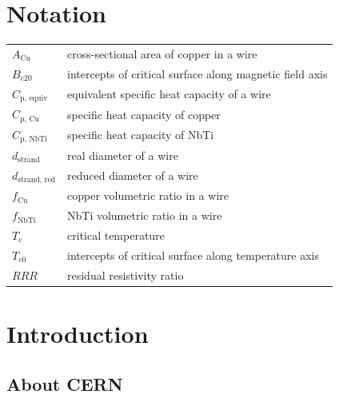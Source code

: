 \documentclass{article}
\begin{document}

\clearpage\thispagestyle{empty}
\tableofcontents
\clearpage\thispagestyle{empty}

\section*{Notation}

\begin{table}[h!]
    \vspace{-1.em} 
    \fontsize{10}{10}
    \selectfont 
    \renewcommand{\arraystretch}{1.5}
    \begin{center}
    \begin{tabular}{ l l }  
    \hline
    $A_\text{Cu}$ & cross-sectional area of copper in a wire \\  
    $B_\text{c20}$ & intercepts of critical surface along magnetic field axis \\  
    $C_\text{p, equiv}$ & equivalent specific heat capacity of a wire \\  
    $C_\text{p, Cu}$ & specific heat capacity of copper \\   
    $C_\text{p, NbTi}$ & specific heat capacity of NbTi \\  
    $d_\text{strand}$ & real diameter of a wire \\  
    $d_\text{strand, red}$ & reduced diameter of a wire \\   
    $f_\text{Cu}$ &  copper volumetric ratio in a wire\\        
    $f_\text{NbTi}$ &  NbTi volumetric ratio in a wire\\   
    $T_\text{c}$ & critical temperature \\
    $T_\text{c0}$ & intercepts of critical surface along temperature axis \\
    $RRR$ & residual resistivity ratio \\
    \hline
     \end{tabular} 
    \end{center}  
 \end{table}
\newpage

\section{Introduction}

\subsection{About CERN}
\end{document}
